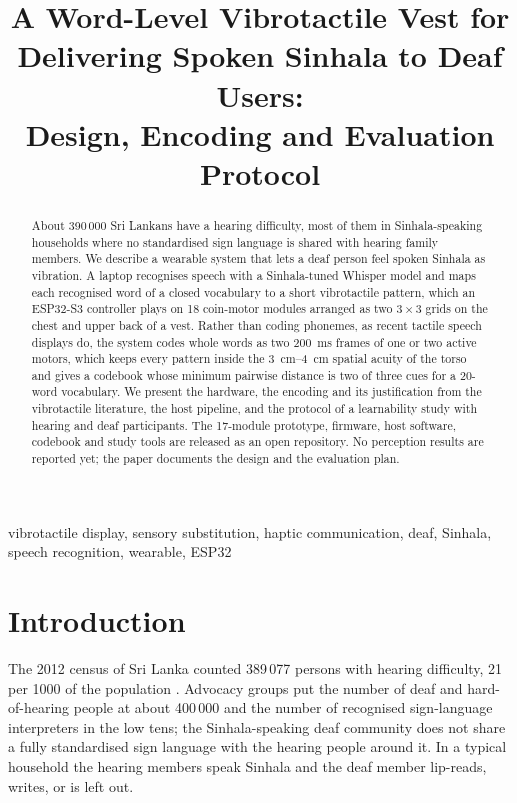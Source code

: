 \documentclass[conference]{IEEEtran}
\title{A Word-Level Vibrotactile Vest for Delivering Spoken Sinhala to Deaf Users:\\Design, Encoding and Evaluation Protocol}
\author{\IEEEauthorblockN{Dilan Perera}
\IEEEauthorblockA{Intelligent Systems \& Mechatronics Research Laboratory (ISMR Labs)\\
Colombo, Sri Lanka\\
\url{https://github.com/ISMR-Labs/Sinhala-Speech-to-Haptic-System-for-the-Hearing-Impaired}}}
\begin{document}
\maketitle

\begin{abstract}
About 390\,000 Sri Lankans have a hearing difficulty, most of them in Sinhala-speaking households where no standardised sign language is shared with hearing family members. We describe a wearable system that lets a deaf person feel spoken Sinhala as vibration. A laptop recognises speech with a Sinhala-tuned Whisper model and maps each recognised word of a closed vocabulary to a short vibrotactile pattern, which an ESP32-S3 controller plays on 18 coin-motor modules arranged as two $3\times3$ grids on the chest and upper back of a vest. Rather than coding phonemes, as recent tactile speech displays do, the system codes whole words as two \SI{200}{ms} frames of one or two active motors, which keeps every pattern inside the \SIrange{3}{4}{cm} spatial acuity of the torso and gives a codebook whose minimum pairwise distance is two of three cues for a 20-word vocabulary. We present the hardware, the encoding and its justification from the vibrotactile literature, the host pipeline, and the protocol of a learnability study with hearing and deaf participants. The 17-module prototype, firmware, host software, codebook and study tools are released as an open repository. No perception results are reported yet; the paper documents the design and the evaluation plan.
\end{abstract}

\begin{IEEEkeywords}
vibrotactile display, sensory substitution, haptic communication, deaf, Sinhala, speech recognition, wearable, ESP32
\end{IEEEkeywords}

\section{Introduction}
The 2012 census of Sri Lanka counted 389\,077 persons with hearing difficulty, 21 per 1000 of the population \cite{census2012}. Advocacy groups put the number of deaf and hard-of-hearing people at about 400\,000 and the number of recognised sign-language interpreters in the low tens; the Sinhala-speaking deaf community does not share a fully standardised sign language with the hearing people around it. In a typical household the hearing members speak Sinhala and the deaf member lip-reads, writes, or is left out.
\end{document}
